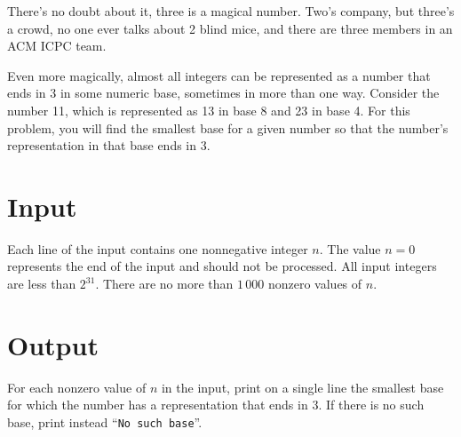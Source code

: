 
\setlength{\columnsep}{15pt}


There's no doubt about it, three is a magical number. Two's company,
but three's a crowd, no one ever talks about 2 blind mice, and there
are three members in an ACM ICPC team.

Even more magically, almost all integers can be represented as a
number that ends in 3 in some numeric base, sometimes in more than one
way.  Consider the number 11, which is represented as 13 in base 8 and
23 in base 4.  For this problem, you will find the smallest base for a
given number so that the number's representation in that base ends in
3.

\section*{Input}

Each line of the input contains one nonnegative integer $n$.  The
value $n = 0$ represents the end of the input and should not be
processed.  All input integers are less than $2^{31}$.  There are no more
than $1\,000$ nonzero values of $n$.

\section*{Output}

For each nonzero value of $n$ in the input, print on a single line the
smallest base for which the number has a representation that ends in 3.
If there is no such base, print instead ``\verb|No such base|''.
